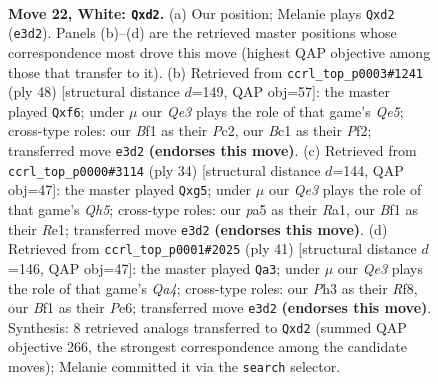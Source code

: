 \documentclass[11pt]{article}
\begin{document}
\clearpage

\begin{figure}[p]\centering
\begin{subfigure}{0.46\textwidth}\centering
\resizebox{\linewidth}{!}{%
\newchessgame
\chessboard[
  setfen={r3k2r/5p2/b4n2/p2pp3/3q2pp/4Q2P/PP1b1PP1/R1B1KB1R w kq - 0 22},
  showmover=false,
  pgfstyle=straightmove, color=movearrow, markmove={e3-d2}
]}
\caption{}
\end{subfigure}\hfill
\begin{subfigure}{0.46\textwidth}\centering
\resizebox{\linewidth}{!}{%
\newchessgame
\chessboard[
  setfen={1r2r1k1/5pp1/2p1pqb1/ppP1Q3/P2P4/1B4R1/2P2P1P/3R2K1 w - - 1 25},
  showmover=false,
  pgfstyle=straightmove, color=movearrow, markmove={e5-f6}
]}
\caption{}
\end{subfigure}
\\[4pt]
\begin{subfigure}{0.46\textwidth}\centering
\resizebox{\linewidth}{!}{%
\newchessgame
\chessboard[
  setfen={r3k2r/1p1b1ppp/1q2p3/2npP1bQ/p7/P6P/1PB2PP1/R1B1R1K1 w kq - 0 18},
  showmover=false,
  pgfstyle=straightmove, color=movearrow, markmove={h5-g5}
]}
\caption{}
\end{subfigure}\hfill
\begin{subfigure}{0.46\textwidth}\centering
\resizebox{\linewidth}{!}{%
\newchessgame
\chessboard[
  setfen={r1b2rk1/5pp1/p1p1p2p/q5P1/1PP4P/2bN1Q2/P4PB1/R4K1R b - - 2 21},
  showmover=false,
  pgfstyle=straightmove, color=movearrow, markmove={a5-a3}
]}
\caption{}
\end{subfigure}
\caption{\textbf{Move 22, White: \texttt{Qxd2}.} (a) Our position; Melanie plays \texttt{Qxd2} (\texttt{e3d2}). Panels (b)--(d) are the retrieved master positions whose correspondence most drove this move (highest QAP objective among those that transfer to it). (b) Retrieved from \texttt{ccrl\_top\_p0003\#1241} (ply 48) [structural distance $d$=149, QAP obj=57]: the master played \texttt{Qxf6}; under $\mu$ our \emph{Qe3} plays the role of that game's \emph{Qe5}; cross-type roles: our \emph{B}f1 as their \emph{P}c2, our \emph{B}c1 as their \emph{P}f2; transferred move \texttt{e3d2} \textbf{(endorses this move)}. (c) Retrieved from \texttt{ccrl\_top\_p0000\#3114} (ply 34) [structural distance $d$=144, QAP obj=47]: the master played \texttt{Qxg5}; under $\mu$ our \emph{Qe3} plays the role of that game's \emph{Qh5}; cross-type roles: our \emph{p}a5 as their \emph{R}a1, our \emph{B}f1 as their \emph{R}e1; transferred move \texttt{e3d2} \textbf{(endorses this move)}. (d) Retrieved from \texttt{ccrl\_top\_p0001\#2025} (ply 41) [structural distance $d$=146, QAP obj=47]: the master played \texttt{Qa3}; under $\mu$ our \emph{Qe3} plays the role of that game's \emph{Qa4}; cross-type roles: our \emph{P}h3 as their \emph{R}f8, our \emph{B}f1 as their \emph{P}e6; transferred move \texttt{e3d2} \textbf{(endorses this move)}. Synthesis: 8 retrieved analogs transferred to \texttt{Qxd2} (summed QAP objective 266, the strongest correspondence among the candidate moves); Melanie committed it via the \texttt{search} selector.}
\label{fig:thought-m42}
\end{figure}
\end{document}
